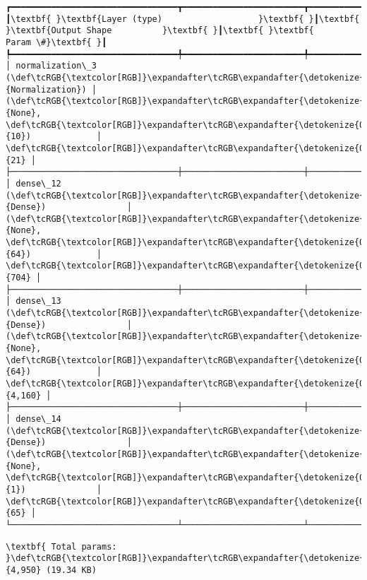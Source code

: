\documentclass[11pt]{article}
\begin{document}
    \begin{Verbatim}[commandchars=\\\{\}]
┏━━━━━━━━━━━━━━━━━━━━━━━━━━━━━━━━━┳━━━━━━━━━━━━━━━━━━━━━━━━┳━━━━━━━━━━━━━━━┓
┃\textbf{ }\textbf{Layer (type)                   }\textbf{ }┃\textbf{ }\textbf{Output Shape          }\textbf{ }┃\textbf{ }\textbf{      Param \#}\textbf{ }┃
┡━━━━━━━━━━━━━━━━━━━━━━━━━━━━━━━━━╇━━━━━━━━━━━━━━━━━━━━━━━━╇━━━━━━━━━━━━━━━┩
│ normalization\_3 (\def\tcRGB{\textcolor[RGB]}\expandafter\tcRGB\expandafter{\detokenize{0,135,255}}{Normalization}) │ (\def\tcRGB{\textcolor[RGB]}\expandafter\tcRGB\expandafter{\detokenize{0,215,255}}{None}, \def\tcRGB{\textcolor[RGB]}\expandafter\tcRGB\expandafter{\detokenize{0,175,0}}{10})             │            \def\tcRGB{\textcolor[RGB]}\expandafter\tcRGB\expandafter{\detokenize{0,175,0}}{21} │
├─────────────────────────────────┼────────────────────────┼───────────────┤
│ dense\_12 (\def\tcRGB{\textcolor[RGB]}\expandafter\tcRGB\expandafter{\detokenize{0,135,255}}{Dense})                │ (\def\tcRGB{\textcolor[RGB]}\expandafter\tcRGB\expandafter{\detokenize{0,215,255}}{None}, \def\tcRGB{\textcolor[RGB]}\expandafter\tcRGB\expandafter{\detokenize{0,175,0}}{64})             │           \def\tcRGB{\textcolor[RGB]}\expandafter\tcRGB\expandafter{\detokenize{0,175,0}}{704} │
├─────────────────────────────────┼────────────────────────┼───────────────┤
│ dense\_13 (\def\tcRGB{\textcolor[RGB]}\expandafter\tcRGB\expandafter{\detokenize{0,135,255}}{Dense})                │ (\def\tcRGB{\textcolor[RGB]}\expandafter\tcRGB\expandafter{\detokenize{0,215,255}}{None}, \def\tcRGB{\textcolor[RGB]}\expandafter\tcRGB\expandafter{\detokenize{0,175,0}}{64})             │         \def\tcRGB{\textcolor[RGB]}\expandafter\tcRGB\expandafter{\detokenize{0,175,0}}{4,160} │
├─────────────────────────────────┼────────────────────────┼───────────────┤
│ dense\_14 (\def\tcRGB{\textcolor[RGB]}\expandafter\tcRGB\expandafter{\detokenize{0,135,255}}{Dense})                │ (\def\tcRGB{\textcolor[RGB]}\expandafter\tcRGB\expandafter{\detokenize{0,215,255}}{None}, \def\tcRGB{\textcolor[RGB]}\expandafter\tcRGB\expandafter{\detokenize{0,175,0}}{1})              │            \def\tcRGB{\textcolor[RGB]}\expandafter\tcRGB\expandafter{\detokenize{0,175,0}}{65} │
└─────────────────────────────────┴────────────────────────┴───────────────┘

    \end{Verbatim}

    
    
    \begin{Verbatim}[commandchars=\\\{\}]
\textbf{ Total params: }\def\tcRGB{\textcolor[RGB]}\expandafter\tcRGB\expandafter{\detokenize{0,175,0}}{4,950} (19.34 KB)

    \end{Verbatim}
\end{document}

